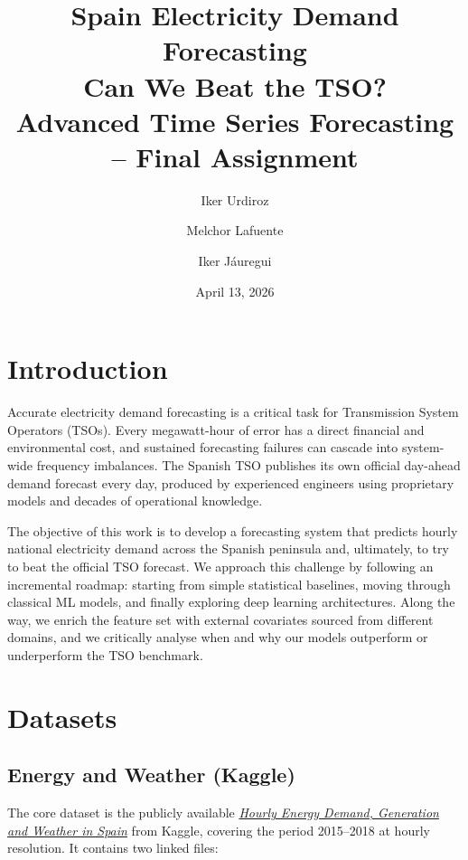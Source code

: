 \documentclass[11pt,a4paper]{article}
\title{
    \vspace{-1.5cm}
    \textbf{Spain Electricity Demand Forecasting} \\[0.3cm]
    \large Can We Beat the TSO? \\[0.2cm]
    \normalsize Advanced Time Series Forecasting -- Final Assignment
}
\author{Iker Urdiroz \and Melchor Lafuente \and Iker Jáuregui}
\date{April 13, 2026}
\begin{document}
\maketitle
\vspace{-1cm}

\section{Introduction}

Accurate electricity demand forecasting is a critical task for Transmission System Operators (TSOs). Every megawatt-hour of error has a direct financial and environmental cost, and sustained forecasting failures can cascade into system-wide frequency imbalances. The Spanish TSO publishes its own official day-ahead demand forecast every day, produced by experienced engineers using proprietary models and decades of operational knowledge.

The objective of this work is to develop a forecasting system that predicts hourly national electricity demand across the Spanish peninsula and, ultimately, to try to beat the official TSO forecast. We approach this challenge by following an incremental roadmap: starting from simple statistical baselines, moving through classical ML models, and finally exploring deep learning architectures. Along the way, we enrich the feature set with external covariates sourced from different domains, and we critically analyse when and why our models outperform or underperform the TSO benchmark.

\section{Datasets}

\subsection{Energy and Weather (Kaggle)}

The core dataset is the publicly available \href{https://www.kaggle.com/datasets/nicholasjhana/energy-consumption-generation-prices-and-weather}{\textit{Hourly Energy Demand, Generation and Weather in Spain}} from Kaggle, covering the period 2015--2018 at hourly resolution. It contains two linked files:
\end{document}
